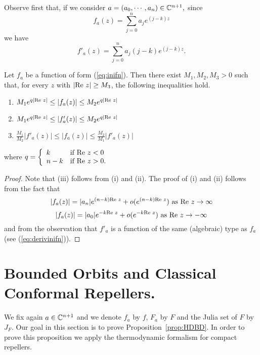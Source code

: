 Observe first that, if we consider $a=(a_0, \cdots, a_n)\in {\mathbb C}^{n+1},$
since
\begin{equation}
  \label{eq:inifn}
  f_a(z)=\sum_{j=0}^{n}a_je^{(j-k)z}
\end{equation}
we have
\begin{equation}
  \label{eq:derivinifn}
  f'_a(z)=\sum_{j=0}^n a_j(j-k) e^{(j-k)z}.
\end{equation}

\begin{lemma}\label{lem:M123}
  Let $f_a$ be a function of form (\ref{eq:inifn}).  Then there exist $M_1,
  M_2, M_3>0$ such that, for every $z$ with $|\textrm{Re } z|\geq M_3$, the following
  inequalities hold.
  \begin{enumerate}
  \item $M_1e^{q|\textrm{Re } z|}\leq |f_a(z)|\leq M_2e^{q|\textrm{Re } z|}$
  \item $M_1e^{q|\textrm{Re } z|}\leq |f'_a(z)|\leq M_2e^{q|\textrm{Re } z|}$
  \item $\frac{M_1}{M_2}|f'_a(z)|\leq |f_a(z)|\leq \frac{
      M_2}{M_1}|f'_a(z)|$
  \end{enumerate}
  where $q=\left\{ \begin{array}{ll} k & \textrm{if } \textrm{Re } z< 0\\ n-k &
      \textrm{if } \textrm{Re } z>0. \end{array}\right.$
\end{lemma} 

\begin{proof}
  Note that (iii) follows from (i) and (ii). The proof of (i) and (ii)
  follows from the fact that
  \[
  |f_a(z)|=|a_n|e^{(n-k)\textrm{Re } z} +o(e^{(n-k)\textrm{Re } z}) \textrm{ as } \textrm{Re }
  z \rightarrow\infty
  \]
  \[
  |f_a(z)|=|a_0|e^{-k\textrm{Re } z}+o(e^{-k\textrm{Re } z})\textrm{ as } \textrm{Re }
  z\rightarrow-\infty
  \]
  and from the observation that $f'_a$ is a function of the same (algebraic)
  type as $f_a$ (see (\ref{eq:derivinifn})).
\end{proof}


\section{Bounded Orbits and Classical Conformal Repellers.}

We fix again $a\in{\mathbb C}^{n+1}$ and we denote $f_a$ by $f$, $F_a$ by $F$ and
the Julia set of $F$ by $J_F. $ Our goal in this section is to prove
Proposition~\ref{prop:HDBD}. In order to prove this proposition we apply the
thermodynamic formalism for compact repellers.

